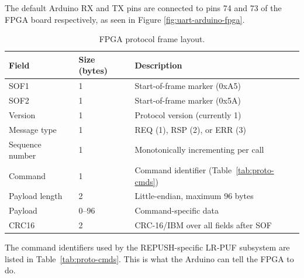 The default Arduino RX and TX pins are connected to pins 74 and 73 of the FPGA board respectively, as seen in Figure \ref{fig:uart-arduino-fpga}.

\begin{table}[ht!]
\centering
\caption{FPGA protocol frame layout.}
\begin{tabular}{lll}
\hline
\textbf{Field} & \textbf{Size (bytes)} & \textbf{Description} \\
\hline
SOF1            & 1 & Start-of-frame marker (0xA5) \\
SOF2            & 1 & Start-of-frame marker (0x5A) \\
Version         & 1 & Protocol version (currently 1) \\
Message type    & 1 & REQ (1), RSP (2), or ERR (3) \\
Sequence number & 1 & Monotonically incrementing per call \\
Command         & 1 & Command identifier (Table~\ref{tab:proto-cmds}) \\
Payload length  & 2 & Little-endian, maximum 96 bytes \\
Payload         & 0--96 & Command-specific data \\
CRC16           & 2 & CRC-16/IBM over all fields after SOF \\
\hline
\end{tabular}
\label{tab:proto-frame}
\end{table}


The command identifiers used by the REPUSH-specific LR-PUF subsystem are listed in Table~\ref{tab:proto-cmds}. This is what the Arduino can tell the FPGA to do.

